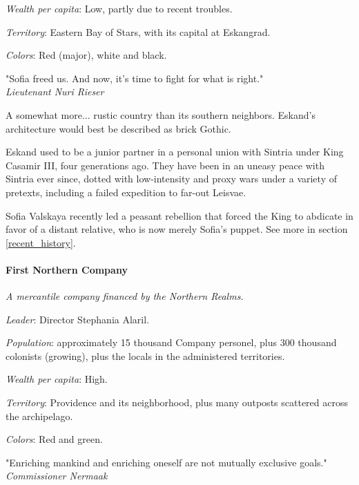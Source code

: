 \textit{Wealth per capita}: Low, partly due to recent troubles.

\textit{Territory}: Eastern Bay of Stars, with its capital at Eskangrad.
    
\textit{Colors}: Red (major), white and black.


\begin{rpg-quotebox}
"Sofia freed us. And now, it's time to fight for what is right." \\ \textendash \textit{Lieutenant Nuri Rieser}
\end{rpg-quotebox}


A somewhat more... rustic country than its southern neighbors. Eskand's architecture would best be described as brick Gothic.

Eskand used to be a junior partner in a personal union with Sintria under King Casamir III, four generations ago. They have been in an uneasy peace with Sintria ever since, dotted with low-intensity and proxy wars under a variety of pretexts, including a failed expedition to far-out Leisvae.

Sofia Valskaya recently led a peasant rebellion that forced the King to abdicate in favor of a distant relative, who is now merely Sofia's puppet. See more in section \ref{recent_history}.



\paragraph{First Northern Company}


\textit{A mercantile company financed by the Northern Realms.}

\textit{Leader}: Director Stephania Alaril.

\textit{Population}: approximately 15 thousand Company personel, plus 300 thousand colonists (growing), plus the locals in the administered territories.

\textit{Wealth per capita}: High.

\textit{Territory}: Providence and its neighborhood, plus many outposts scattered across the archipelago.
    
\textit{Colors}: Red and green.


\begin{rpg-quotebox}
"Enriching mankind and enriching oneself are not mutually exclusive goals." \\ \textendash \textit{Commissioner Nermaak}
\end{rpg-quotebox}


